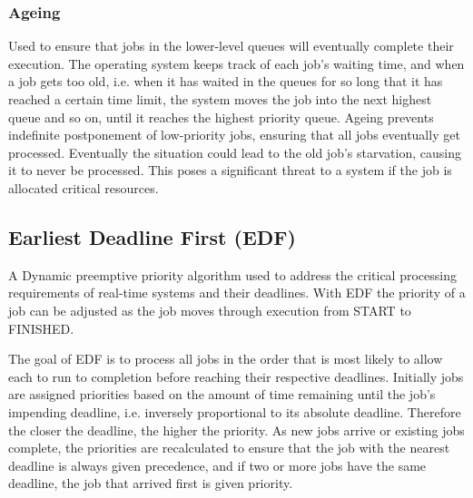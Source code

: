 \documentclass[12pt letter]{report}
\begin{document}
\subsubsection{Ageing}


Used to ensure that jobs in the lower-level queues will eventually
complete their execution. The operating system keeps track of each
job's waiting time, and when a job gets too old, i.e. when it has
waited in the queues for so long that it has reached a certain time
limit, the system moves the job into the next highest queue and so
on, until it reaches the highest priority queue. Ageing prevents
indefinite postponement of low-priority jobs, ensuring that all jobs
eventually get processed. Eventually the situation could lead to the
old job's starvation, causing it to never be processed. This poses a
significant threat to a system if the job is allocated critical resources.

\subsection{Earliest Deadline First (EDF)}
A Dynamic preemptive priority algorithm used to address the critical
processing requirements of real-time systems and their deadlines.
With EDF the priority of a job can be adjusted as the job moves
through execution from START to FINISHED.

The goal of EDF is to process all jobs in the order that is most
likely to allow each to run to completion before reaching their
respective deadlines. Initially jobs are assigned priorities based on
the amount of time remaining until the job's impending deadline, i.e.
inversely proportional to its absolute deadline. Therefore the closer
the deadline, the higher the priority. As new jobs arrive or existing
jobs complete, the priorities are recalculated to ensure that the job
with the nearest deadline is always given precedence, and if two or
more jobs have the same deadline, the job that arrived first is given priority.

\end{document}
